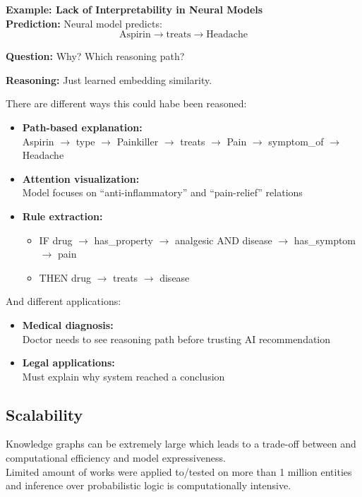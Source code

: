 \begin{bsp}
    \textbf{Example: Lack of Interpretability in Neural Models} \\
    \textbf{Prediction:}
    Neural model predicts:
    \[
        \text{Aspirin} \rightarrow \text{treats} \rightarrow \text{Headache}
    \]

    \textbf{Question:}
    Why? Which reasoning path?

    \textbf{Reasoning:}
    Just learned embedding similarity.
\end{bsp}
There are different ways this could habe been reasoned:
\begin{itemize}
    \item \textbf{Path-based explanation:} \\
    Aspirin $\rightarrow$ type $\rightarrow$ Painkiller $\rightarrow$ treats $\rightarrow$ Pain $\rightarrow$ symptom\_of $\rightarrow$ Headache

    \item \textbf{Attention visualization:} \\
    Model focuses on ``anti-inflammatory'' and ``pain-relief'' relations

    \item \textbf{Rule extraction:}
    \begin{itemize}
        \item IF drug $\rightarrow$ has\_property $\rightarrow$ analgesic AND disease $\rightarrow$ has\_symptom $\rightarrow$ pain
        \item THEN drug $\rightarrow$ treats $\rightarrow$ disease
    \end{itemize}
\end{itemize}
And different applications:
\begin{itemize}
    \item \textbf{Medical diagnosis:} \\
    Doctor needs to see reasoning path before trusting AI recommendation

    \item \textbf{Legal applications:} \\
    Must explain why system reached a conclusion
\end{itemize}

\subsection*{Scalability}
Knowledge graphs can be extremely large which leads to a trade-off between and computational efficiency and model
expressiveness. \\ %
Limited amount of works were applied to/tested on more than 1 million entities and inference over probabilistic
logic is computationally intensive.


